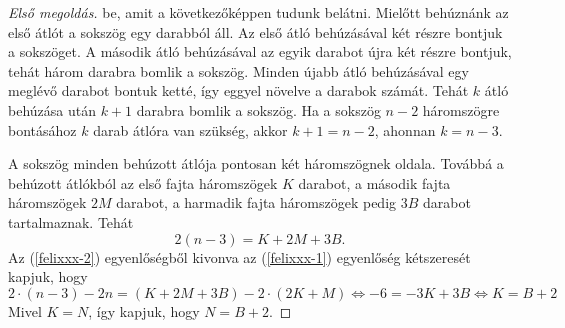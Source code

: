 \begin{proof}[Első megoldás]
be, amit a következőképpen tudunk belátni. Mielőtt behúznánk az első
átlót a sokszög egy darabból áll. Az első átló behúzásával két részre
bontjuk a sokszöget. A második átló behúzásával az egyik darabot újra
két részre bontjuk, tehát három darabra bomlik a sokszög. Minden újabb
átló behúzásával egy meglévő darabot bontuk ketté, így eggyel növelve
a darabok számát. Tehát $k$ átló behúzása után $k+1$ darabra bomlik
a sokszög. Ha a sokszög $n-2$ háromszögre bontásához $k$ darab átlóra
van szükség, akkor $k+1=n-2$, ahonnan $k=n-3$.\par A sokszög minden
behúzott átlója pontosan két háromszögnek oldala. Továbbá a behúzott
átlókból az első fajta háromszögek $K$ darabot, a második fajta háromszögek
$2M$ darabot, a harmadik fajta háromszögek pedig $3B$ darabot tartalmaznak.
Tehát 
\begin{equation}
2(n-3)=K+2M+3B.\label{felixxx-2}
\end{equation}
Az (\ref{felixxx-2}) egyenlőségből kivonva az (\ref{felixxx-1})
egyenlőség kétszeresét kapjuk, hogy 
\[
2\cdot(n-3)-2n=(K+2M+3B)-2\cdot(2K+M)\iff-6=-3K+3B\iff K=B+2
\]
Mivel $K=N$, így kapjuk, hogy $N=B+2$.
\end{proof}
%
